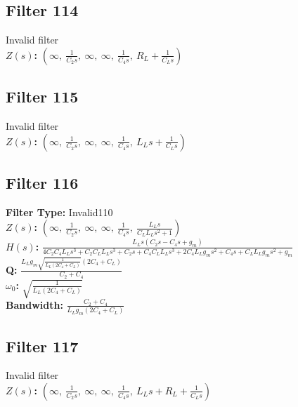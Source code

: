 \documentclass{article}
\begin{document}
\subsection*{Filter 114}
Invalid filter \\ 
\textbf{$Z(s)$:} $\left( \infty, \  \frac{1}{C_{2} s}, \  \infty, \  \infty, \  \frac{1}{C_{4} s}, \  R_{L} + \frac{1}{C_{L} s}\right)$ \\ 
\subsection*{Filter 115}
Invalid filter \\ 
\textbf{$Z(s)$:} $\left( \infty, \  \frac{1}{C_{2} s}, \  \infty, \  \infty, \  \frac{1}{C_{4} s}, \  L_{L} s + \frac{1}{C_{L} s}\right)$ \\ 
\subsection*{Filter 116}
\textbf{Filter Type:} Invalid110 \\ 
\textbf{$Z(s)$:} $\left( \infty, \  \frac{1}{C_{2} s}, \  \infty, \  \infty, \  \frac{1}{C_{4} s}, \  \frac{L_{L} s}{C_{L} L_{L} s^{2} + 1}\right)$ \\ 
\textbf{$H(s)$:} $\frac{L_{L} s \left(C_{2} s - C_{4} s + g_{m}\right)}{4 C_{2} C_{4} L_{L} s^{3} + C_{2} C_{L} L_{L} s^{3} + C_{2} s + C_{4} C_{L} L_{L} s^{3} + 2 C_{4} L_{L} g_{m} s^{2} + C_{4} s + C_{L} L_{L} g_{m} s^{2} + g_{m}}$ \\ 
\textbf{Q:} $\frac{L_{L} g_{m} \sqrt{\frac{1}{L_{L} \left(2 C_{4} + C_{L}\right)}} \left(2 C_{4} + C_{L}\right)}{C_{2} + C_{4}}$ \\ 
\textbf{$\omega_0$:} $\sqrt{\frac{1}{L_{L} \left(2 C_{4} + C_{L}\right)}}$ \\ 
\textbf{Bandwidth:} $\frac{C_{2} + C_{4}}{L_{L} g_{m} \left(2 C_{4} + C_{L}\right)}$ \\ 
\subsection*{Filter 117}
Invalid filter \\ 
\textbf{$Z(s)$:} $\left( \infty, \  \frac{1}{C_{2} s}, \  \infty, \  \infty, \  \frac{1}{C_{4} s}, \  L_{L} s + R_{L} + \frac{1}{C_{L} s}\right)$ \\ 
\end{document}
